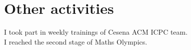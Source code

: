 \documentclass[curriculum-vitae-eng]{subfiles}
\begin{document}
	\section*{Other activities}
		 I took part in weekly trainings of Cesena ACM ICPC team.\\

		 I reached the second stage of Maths Olympics.
	
\end{document}

